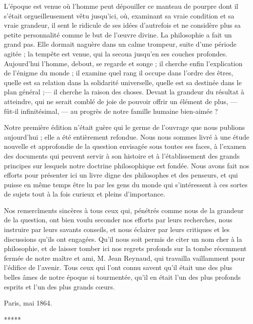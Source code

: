 \documentclass[a4paper, 11pt, oneside, landscape]{article}
\begin{document}
L'époque est venue où l'homme peut dépouiller ce manteau de pourpre dont il s'était orgueilleusement vêtu jusqu'ici, où, examinant sa vraie condition et sa vraie grandeur, il sent le ridicule de ses idées d'autrefois et ne considère plus sa petite personnalité comme le but de l'œuvre divine. La philosophie a fait un grand pas. Elle dormait naguère dans un calme trompeur, suite d'une période agitée ; la tempête est venue, qui la secoua jusqu'en ses couches profondes. Aujourd'hui l'homme, debout, se regarde et songe ; il cherche enfin l'explication de l'énigme du monde ; il examine quel rang il occupe dans l'ordre des êtres, quelle est sa relation dans la solidarité universelle, quelle est sa destinée dans le plan général ;--- il cherche la raison des choses. Devant la grandeur du résultat à atteindre, qui ne serait comblé de joie de pouvoir offrir un élément de plus, --- fût-il infinitésimal, --- au progrès de notre famille humaine bien-aimée ?

Notre première édition n'était guère qui le germe de l'ouvrage que nous publions aujourd'hui ; elle a été entièrement refondue. Nous nous sommes livré à une étude nouvelle et approfondie de la question envisagée sous toutes ses faces, à l'examen des documents qui peuvent servir à son histoire et à l'établissement des grands principes sur lesquels notre doctrine philosophique est fondée. Nous avons fait nos efforts pour présenter ici un livre digne des philosophes et des penseurs, et qui puisse en même temps être lu par les gens du monde qui s'intéressent à ces sortes de sujets tout à la fois curieux et pleins d'importance.

Nos remercîments sincères à tous ceux qui, pénétrés comme nous de la grandeur de la question, ont bien voulu seconder nos efforts par leurs recherches, nous instruire par leurs savants conseils, et nous éclairer par leurs critiques et les discussions qu'ils ont engagées. Qu'il nous soit permis de citer un nom cher à la philosophie, et de laisser tomber ici nos regrets profonds sur la tombe récemment fermée de notre maître et ami, M. Jean Reynaud, qui travailla vaillamment pour l'édifice de l'avenir. Tous ceux qui l'ont connu savent qu'il était une des plus belles âmes de notre époque si tourmentée, qu'il en était l'un des plus profonds esprits et l'un des plus grands cœurs.

\bigskip

Paris, mai 1864.

\bigskip
\centerline{*\hspace{15mm}*\hspace{15mm}*\hspace{15mm}*\hspace{15mm}*}
\bigskip
\end{document}
